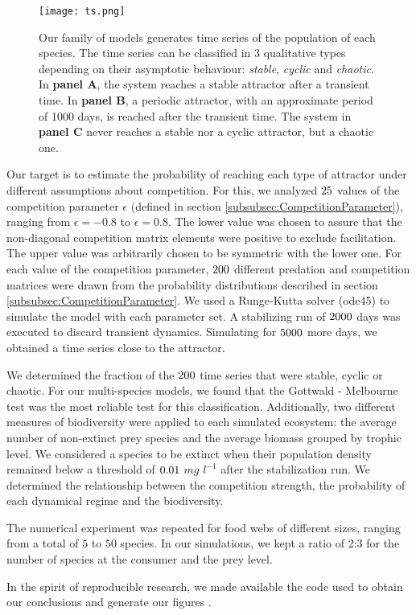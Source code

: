 \begin{figure}
	\begin{center}
		\texttt{[image: ts.png]}
	\end{center}
	\caption{Our family of models generates time series of the population of each species. The time series can be classified in $3$ qualitative types depending on their asymptotic behaviour: \textit{stable}, \textit{cyclic} and \textit{chaotic}. In \textbf{panel A}, the system reaches a stable attractor after a transient time. In \textbf{panel B}, a periodic attractor, with an approximate period of 1000 days, is reached after the transient time. The system in \textbf{panel C} never reaches a stable nor a cyclic attractor, but a chaotic one.}
	\label{fig:TimeSeries}
\end{figure}

Our target is to estimate the probability of reaching each type of attractor under different assumptions about competition. For this, we analyzed $25$ values of the competition parameter $\epsilon$ (defined in section \ref{subsubsec:CompetitionParameter}), ranging from $\epsilon = -0.8$ to $\epsilon = 0.8$. The lower value was chosen to assure that the non-diagonal competition matrix elements were positive to exclude facilitation. The upper value was arbitrarily chosen to be symmetric with the lower one. For each value of the competition parameter, $200$ different predation and competition matrices were drawn from the probability distributions described in section \ref{subsubsec:CompetitionParameter}. We used a Runge-Kutta solver (ode45) to simulate the model with each parameter set. A stabilizing run of $ 2000 $ days was executed to discard transient dynamics. Simulating for $ 5000 $ more days, we obtained a time series close to the attractor.

We determined the fraction of the $200$ time series that were stable, cyclic or chaotic.  For our multi-species models, we found that the Gottwald - Melbourne test \citep{Gottwald2009} was the most reliable test for this classification.  Additionally, two different measures of biodiversity were applied to each simulated ecosystem: the average number of non-extinct prey species and the average biomass grouped by trophic level. We considered a species to be extinct when their population density remained below a threshold of $0.01$ $mg$ $l^{-1}$ after the stabilization run. We determined the relationship between the competition strength, the probability of each dynamical regime and the biodiversity.

The numerical experiment was repeated for food webs of different sizes, ranging from a total of $5$ to $50$ species. In our simulations, we kept a ratio of 2:3 for the number of species at the consumer and the prey level.

In the spirit of reproducible research, we made available the code used to obtain our conclusions and generate our figures \citep{Rodriguez-Sanchez-code-neuchaos}.